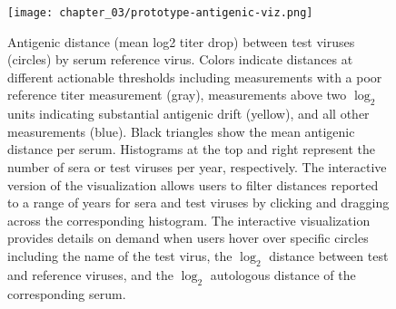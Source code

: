 \begin{figure}
  \centering
  \texttt{[image: chapter\_03/prototype-antigenic-viz.png]}
  \caption{\label{fig:prototype-antigenic-viz} Antigenic distance (mean log2 titer drop) between test viruses (circles) by serum reference virus.
    Colors indicate distances at different actionable thresholds including measurements with a poor reference titer measurement (gray), measurements above two $\log_{2}$ units indicating substantial antigenic drift (yellow), and all other measurements (blue).
    Black triangles show the mean antigenic distance per serum.
    Histograms at the top and right represent the number of sera or test viruses per year, respectively.
    The interactive version of the visualization allows users to filter distances reported to a range of years for sera and test viruses by clicking and dragging across the corresponding histogram.
    The interactive visualization provides details on demand when users hover over specific circles including the name of the test virus, the $\log_{2}$ distance between test and reference viruses, and the $\log_{2}$ autologous distance of the corresponding serum.
  }
\end{figure}
